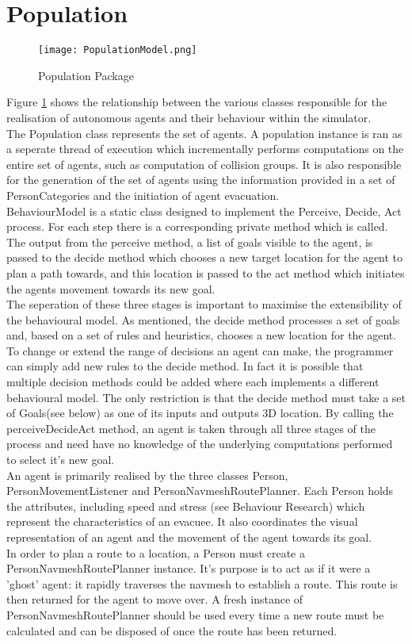 \documentclass{article}
\begin{document}
\section{Population}

\begin{figure}[here]
\centering
\texttt{[image: PopulationModel.png]}
\caption{Population Package}
\label{fig:populationmodel}
\end{figure}


Figure \ref{fig:populationmodel} shows the relationship between the various classes responsible
for the realisation of autonomous agents and their behaviour within the simulator.
\\
The Population class represents the set of agents. A population instance is ran as a seperate thread of execution which
incrementally performs computations on the entire set of agents, such as computation of collision groups. It is also responsible
for the generation of the set of agents using the information provided in a set of PersonCategories and the initiation
of agent evacuation.
\\
BehaviourModel is a static class designed to implement the Perceive, Decide, Act process. For each step there is a corresponding 
private method which is called. The output from the perceive method, a list of goals visible to the agent, is passed to the decide method
which chooses a new target location for the agent to plan a path towards, and this location is passed to the act method which initiates the agents
movement towards its new goal.
\\
The seperation of these three stages is important to maximise the extensibility of the behavioural model. As mentioned, the decide method processes a set of
goals and, based on a set of rules and heuristics, chooses a new location for the agent. To change or extend the range of decisions an agent can make,
the programmer can simply add new rules to the decide method. In fact it is possible that multiple decision methods could be added where each implements
a different behavioural model. The only restriction is that the decide method must take a set of Goals(see below) as one of its inputs and outputs 3D location.
By calling the perceiveDecideAct method, an agent is taken through all three stages of the process and need have no knowledge of the underlying
computations performed to select it's new goal.
\\

An agent is primarily realised by the three classes Person, PersonMovementListener and PersonNavmeshRoutePlanner. 
Each Person holds the attributes, including speed and stress (see Behaviour Research) which represent the characteristics of 
an evacuee. It also coordinates the visual representation of an agent and the movement of the agent towards its goal.
\\
In order to plan a route to a location, a Person must create a PersonNavmeshRoutePlanner instance. It's purpose is to act 
as if it were a 'ghost' agent: it rapidly traverses the navmesh to establish a route. This route is then returned for the 
agent to move over. A fresh instance of PersonNavmeshRoutePlanner should be used every time a new route must be calculated and can be disposed
of once the route has been returned.
\end{document}
